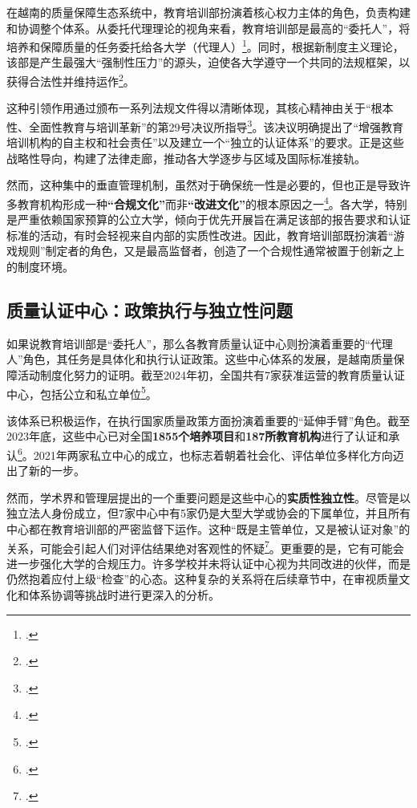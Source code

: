 在越南的质量保障生态系统中，教育培训部扮演着核心权力主体的角色，负责构建和协调整个体系。从委托代理理论的视角来看，教育培训部是最高的“委托人”，将培养和保障质量的任务委托给各大学（代理人）\footcite{Kivisto2008}。同时，根据新制度主义理论，该部是产生最强大“强制性压力”的源头，迫使各大学遵守一个共同的法规框架，以获得合法性并维持运作\footcite{MeyerPowell2020}。

这种引领作用通过颁布一系列法规文件得以清晰体现，其核心精神由关于“根本性、全面性教育与培训革新”的第29号决议所指导\footcite{nghi_quyet_29_2013}。该决议明确提出了“增强教育培训机构的自主权和社会责任”以及建立一个“独立的认证体系”的要求。正是这些战略性导向，构建了法律走廊，推动各大学逐步与区域及国际标准接轨。

然而，这种集中的垂直管理机制，虽然对于确保统一性是必要的，但也正是导致许多教育机构形成一种\textbf{“合规文化”}而非\textbf{“改进文化”}的根本原因之一\footcite{pham2021governance}。各大学，特别是严重依赖国家预算的公立大学，倾向于优先开展旨在满足该部的报告要求和认证标准的活动，有时会轻视来自内部的实质性改进。因此，教育培训部既扮演着“游戏规则”制定者的角色，又是最高监督者，创造了一个合规性通常被置于创新之上的制度环境。

\subsection{质量认证中心：政策执行与独立性问题}
\label{subsec:vai_tro_trungtamkd}

如果说教育培训部是“委托人”，那么各教育质量认证中心则扮演着重要的“代理人”角色，其任务是具体化和执行认证政策。这些中心体系的发展，是越南质量保障活动制度化努力的证明。截至2024年初，全国共有7家获准运营的教育质量认证中心，包括公立和私立单位\footcite{tuoitre_kdcl_stats_2024}。

该体系已积极运作，在执行国家质量政策方面扮演着重要的“延伸手臂”角色。截至2023年底，这些中心已对全国\textbf{1855个培养项目}和\textbf{187所教育机构}进行了认证和承认\footcite{tuoitre_kdcl_stats_2024}。2021年两家私立中心的成立，也标志着朝着社会化、评估单位多样化方向迈出了新的一步。

然而，学术界和管理层提出的一个重要问题是这些中心的\textbf{实质性独立性}。尽管是以独立法人身份成立，但7家中心中有5家仍是大型大学或协会的下属单位，并且所有中心都在教育培训部的严密监督下运作。这种“既是主管单位，又是被认证对象”的关系，可能会引起人们对评估结果绝对客观性的怀疑\footcite{giaoducnet_kdcl_list_2023}。更重要的是，它有可能会进一步强化大学的合规压力。许多学校并未将认证中心视为共同改进的伙伴，而是仍然抱着应付上级“检查”的心态。这种复杂的关系将在后续章节中，在审视质量文化和体系协调等挑战时进行更深入的分析。






























